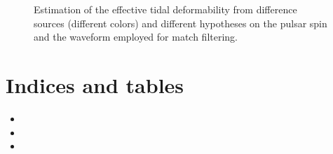 \documentclass[letterpaper,10pt,english]{sphinxmanual}
\begin{document}
\begin{figure}[htbp]
\centering
\capstart

\noindent{}
\caption{Estimation of the effective tidal deformability from difference sources (different colors) and different hypotheses on the pulsar spin and the waveform employed for match filtering.}\label{\detokenize{source/api/setup_astro_gw:id1}}\end{figure}


\chapter{Indices and tables}
\label{\detokenize{index:indices-and-tables}}\begin{itemize}
\item {} 
\sphinxAtStartPar
{}

\item {} 
\sphinxAtStartPar
{}

\item {} 
\sphinxAtStartPar
{}

\end{itemize}
\end{document}
